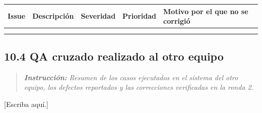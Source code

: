 {\def\LTcaptype{none} %
\begin{longtable}[]{@{}
  >{\raggedright\arraybackslash}p{}
  >{\raggedright\arraybackslash}p{}
  >{\raggedright\arraybackslash}p{}
  >{\raggedright\arraybackslash}p{}
  >{\raggedright\arraybackslash}p{}@{}}
\toprule\noalign{}
\begin{minipage}[b]{\linewidth}\raggedright
\textbf{Issue}
\end{minipage} & \begin{minipage}[b]{\linewidth}\raggedright
\textbf{Descripción}
\end{minipage} & \begin{minipage}[b]{\linewidth}\raggedright
\textbf{Severidad}
\end{minipage} & \begin{minipage}[b]{\linewidth}\raggedright
\textbf{Prioridad}
\end{minipage} & \begin{minipage}[b]{\linewidth}\raggedright
\textbf{Motivo por el que no se corrigió}
\end{minipage} \\
\midrule\noalign{}
\endhead
\bottomrule\noalign{}
\endlastfoot
& & & & \\
& & & & \\
\end{longtable}
}

\subsection{10.4 QA cruzado realizado al otro
equipo}\label{qa-cruzado-realizado-al-otro-equipo}

\begin{quote}
\emph{\textbf{Instrucción:}} \emph{Resumen de los casos ejecutados en}
\emph{el sistema del otro equipo, los defectos reportados y las}
\emph{correcciones verificadas en la ronda 2.}
\end{quote}

{[}Escriba aquí.{]}
